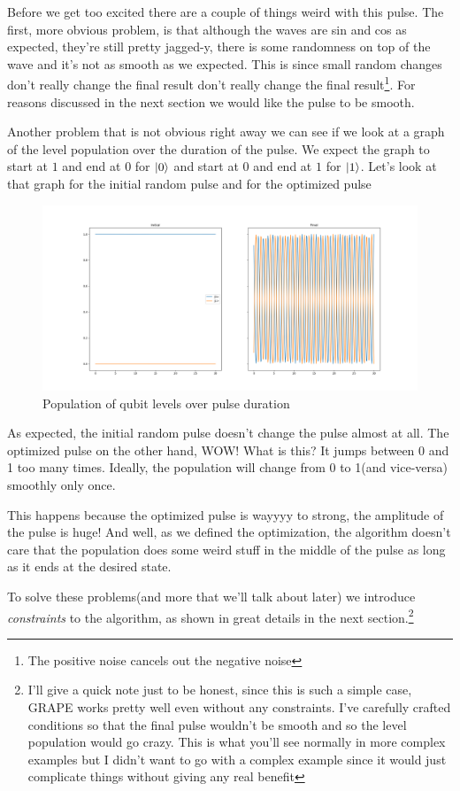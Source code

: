 \documentclass[english, a4paper, 12pt, twoside]{article}
\numberwithin{equation}{section} %
\begin{document}
Before we get too excited there are a couple of things weird with this pulse. The first, more obvious problem, is that although the waves are sin and cos as expected, they're still pretty jagged-y, there is some randomness on top of the wave and it's not as smooth as we expected. This is since small random changes don't really change the final result don't really change the final result\footnote{The positive noise cancels out the negative noise}. For reasons discussed in the next section we would like the pulse to be smooth.

Another problem that is not obvious right away we can see if we look at a graph of the level population over the duration of the pulse. We expect the graph to start at $1$ and end at $0$ for $\ket{0}$ and start at $0$ and end at $1$ for $\ket{1}$. Let's look at that graph for the initial random pulse and for the optimized pulse
\begin{figure}[H]
    \centering
    \includegraphics[width=1\columnwidth]{Results/No-Constraints-single-qubit/level-population.png}
    \caption{Population of qubit levels over pulse duration}
    \label{fig:GRAPE-first-example-level-population}
\end{figure}  %
As expected, the initial random pulse doesn't change the pulse almost at all. The optimized pulse on the other hand, WOW! What is this? It jumps between 0 and 1 too many times. Ideally, the population will change from 0 to 1(and vice-versa) smoothly only once.

This happens because the optimized pulse is wayyyy to strong, the amplitude of the pulse is huge! And well, as we defined the optimization, the algorithm doesn't care that the population does some weird stuff in the middle of the pulse as long as it ends at the desired state.

To solve these problems(and more that we'll talk about later) we introduce \textit{constraints} to the algorithm, as shown in great details in the next section.\footnote{I'll give a quick note just to be honest, since this is such a simple case, GRAPE works pretty well even without any constraints. I've carefully crafted conditions so that the final pulse wouldn't be smooth and so the level population would go crazy. This is what you'll see normally in more complex examples but I didn't want to go with a complex example since it would just complicate things without giving any real benefit}
\end{document}
